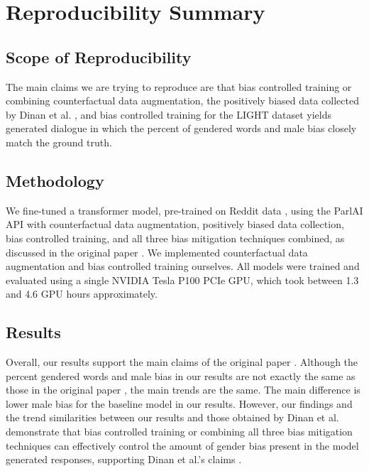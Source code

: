 \section*{\centering Reproducibility Summary}

\subsection*{Scope of Reproducibility}

The main claims we are trying to reproduce are that bias controlled training or combining counterfactual data augmentation, the positively biased data collected by Dinan et al. \supercite{dinan2020}, and bias controlled training for the LIGHT dataset yields generated dialogue in which the percent of gendered words and male bias closely match the ground truth.

\subsection*{Methodology}

We fine-tuned a transformer model, pre-trained on Reddit data \supercite{redditmodel}, using the ParlAI API \supercite{miller2018} with counterfactual data augmentation, positively biased data collection, bias controlled training, and all three bias mitigation techniques combined, as discussed in the original paper \supercite{dinan2020}. We implemented counterfactual data augmentation and bias controlled training ourselves. All models were trained and evaluated using a single NVIDIA Tesla P100 PCIe GPU, which took between 1.3 and 4.6 GPU hours approximately.

\subsection*{Results}

Overall, our results support the main claims of the original paper \supercite{dinan2020}. Although the percent gendered words and male bias in our results are not exactly the same as those in the original paper \supercite{dinan2020}, the main trends are the same. The main difference is lower male bias for the baseline model in our results. However, our findings and the trend similarities between our results and those obtained by Dinan et al. \supercite{dinan2020} demonstrate that bias controlled training or combining all three bias mitigation techniques can effectively control the amount of gender bias present in the model generated responses, supporting Dinan et al.'s claims \supercite{dinan2020}.

